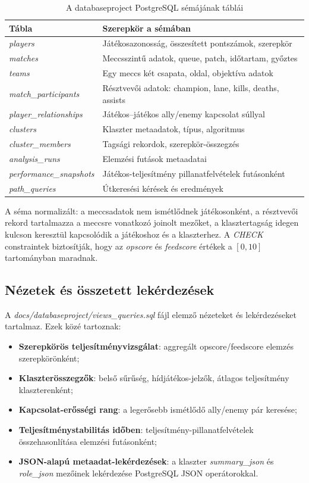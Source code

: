 \begin{table}[H]
\centering
\caption{A databaseproject PostgreSQL sémájának táblái}
\begin{tabularx}{\textwidth}{>{\raggedright\arraybackslash}p{4.5cm}X}
\toprule
\textbf{Tábla} & \textbf{Szerepkör a sémában} \\
\midrule
\textit{players} & Játékosazonosság, összesített pontszámok, szerepkör \\
\textit{matches} & Meccsszintű adatok, queue, patch, időtartam, győztes \\
\textit{teams} & Egy meccs két csapata, oldal, objektíva adatok \\
\textit{match\_participants} & Résztvevői adatok: champion, lane, kills, deaths, assists \\
\textit{player\_relationships} & Játékos--játékos ally/enemy kapcsolat súllyal \\
\textit{clusters} & Klaszter metaadatok, típus, algoritmus \\
\textit{cluster\_members} & Tagsági rekordok, szerepkör-összegzés \\
\textit{analysis\_runs} & Elemzési futások metaadatai \\
\textit{performance\_snapshots} & Játékos-teljesítmény pillanatfelvételek futásonként \\
\textit{path\_queries} & Útkeresési kérések és eredmények \\
\bottomrule
\end{tabularx}
\end{table}

A séma normalizált: a meccsadatok nem ismétlődnek játékosonként, a résztvevői rekord tartalmazza a meccsre vonatkozó joinolt mezőket, a klasztertagság idegen kulcson keresztül kapcsolódik a játékoshoz és a klaszterhez. A \textit{CHECK} constraintek biztosítják, hogy az \textit{opscore} és \textit{feedscore} értékek a $[0,10]$ tartományban maradnak.

\subsection{Nézetek és összetett lekérdezések}

A \textit{docs/databaseproject/views\_queries.sql} fájl elemző nézeteket és lekérdezéseket tartalmaz. Ezek közé tartoznak:
\begin{itemize}
    \item \textbf{Szerepkörös teljesítményvizsgálat}: aggregált opscore/feedscore elemzés szerepkörönként;
    \item \textbf{Klaszterösszegzők}: belső sűrűség, hídjátékos-jelzők, átlagos teljesítmény klaszterenként;
    \item \textbf{Kapcsolat-erősségi rang}: a legerősebb ismétlődő ally/enemy pár keresése;
    \item \textbf{Teljesítménystabilitás időben}: teljesítmény-pillanatfelvételek összehasonlítása elemzési futásonként;
    \item \textbf{JSON-alapú metaadat-lekérdezések}: a klaszter \textit{summary\_json} és \textit{role\_json} mezőinek lekérdezése PostgreSQL JSON operátorokkal.
\end{itemize}

